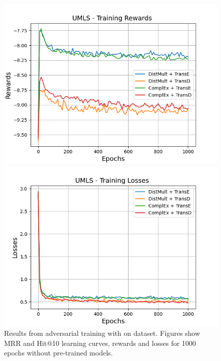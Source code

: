 \begin{figure}[H]
    \begin{minipage}{.5\textwidth}
      \centering
      \includegraphics[width=\linewidth]{figures/results/gan_train/not_pretrained/uncertainty/max_distribution/entropy/umls/1k_epochs/uncertainty_umls_rew.png}
    \end{minipage}%
     \begin{minipage}{.5\textwidth}
      \centering
      \includegraphics[width=\linewidth]{figures/results/gan_train/not_pretrained/uncertainty/max_distribution/entropy/umls/1k_epochs/uncertainty_umls_losses.png}
    \end{minipage}%
    \caption{Results from adversarial training with \ussoftmax on \umls dataset.
    Figures show MRR and Hit@10 learning curves, rewards and losses for 1000 epochs without pre-trained models.}
    \label{fig:gan_train_not_pretrained_ussoftmax_umls}
\end{figure}
